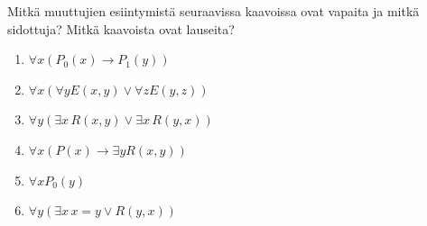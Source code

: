 \documentclass[11pt,a4paper]{amsart}
\begin{document}
\begin{exercise}
  Mitkä muuttujien esiintymistä seuraavissa kaavoissa ovat vapaita ja mitkä
  sidottuja? Mitkä kaavoista ovat lauseita?
  \begin{enumerate}[label=(\alph*)]
    \item \(\forall x(P_0(x) \to P_1(y))\)
    \item \(\forall x(\forall yE(x,y) \lor \forall zE(y,z))\)
    \item \(\forall y(\exists x\,R(x,y) \lor \exists x\,R(y,x))\)
    \item \(\forall x(P(x) \to \exists yR(x,y))\)
    \item \(\forall xP_0(y)\)
    \item \(\forall y(\exists x\,x = y \lor R(y,x))\)
  \end{enumerate}
\end{exercise}
\end{document}
